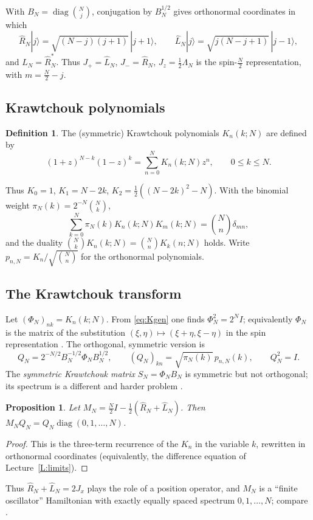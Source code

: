 \documentclass[11pt,reqno]{amsart}
\newtheorem{proposition}[theorem]{Proposition}
\theoremstyle{definition}
\newtheorem{definition}[theorem]{Definition}
\theoremstyle{remark}
\newcommand{\Id}{I}
\DeclareMathOperator{\diag}{diag}
\begin{document}
With $B_N=\diag\binom Nj$, conjugation by $B_N^{1/2}$ gives orthonormal
coordinates in which
\[
\widehat R_N|j\rangle=\sqrt{(N-j)(j+1)}\,|j+1\rangle,\qquad
\widehat L_N|j\rangle=\sqrt{j(N-j+1)}\,|j-1\rangle,
\]
and $\widehat L_N=\widehat R_N^*$. Thus $J_+=\widehat L_N$,
$J_-=\widehat R_N$, $J_z=\frac12\Lambda_N$ is the spin-$\frac N2$
representation, with $m=\frac N2-j$.

\subsection{Krawtchouk polynomials}
\begin{definition}
The (symmetric) Krawtchouk polynomials $K_n(k;N)$ are defined by
\begin{equation}\label{eq:Kgen}
(1+z)^{N-k}(1-z)^k=\sum_{n=0}^NK_n(k;N)z^n,\qquad 0\le k\le N.
\end{equation}
\end{definition}
Thus $K_0=1$, $K_1=N-2k$, $K_2=\frac12((N-2k)^2-N)$. With the binomial
weight $\pi_N(k)=2^{-N}\binom Nk$,
\begin{equation}\label{eq:Korth}
\sum_{k=0}^N\pi_N(k)K_n(k;N)K_m(k;N)=\binom Nn\delta_{mn},
\end{equation}
and the duality $\binom NkK_n(k;N)=\binom NnK_k(n;N)$ holds.
Write $p_{n,N}=K_n/\sqrt{\binom Nn}$ for the orthonormal polynomials.

\subsection{The Krawtchouk transform}
Let $(\Phi_N)_{nk}=K_n(k;N)$. From \eqref{eq:Kgen} one finds
$\Phi_N^2=2^N\Id$; equivalently $\Phi_N$ is the matrix of the
substitution $(\xi,\eta)\mapsto(\xi+\eta,\xi-\eta)$ in the spin
representation \cite{FeinsilverKocik2005}. The orthogonal, symmetric
version is
\begin{equation}\label{eq:Q}
Q_N=2^{-N/2}B_N^{-1/2}\Phi_NB_N^{1/2},\qquad
(Q_N)_{kn}=\sqrt{\pi_N(k)}\,p_{n,N}(k),\qquad Q_N^2=\Id.
\end{equation}
The \emph{symmetric Krawtchouk matrix} $S_N=\Phi_NB_N$ is symmetric but
not orthogonal; its spectrum is a different and harder problem
\cite{FeinsilverFitzgerald1996}.

\begin{proposition}\label{prop:Qdiag}
Let $M_N=\frac N2\Id-\frac12(\widehat R_N+\widehat L_N)$. Then
$M_NQ_N=Q_N\diag(0,1,\dots,N)$.
\end{proposition}
\begin{proof}
This is the three-term recurrence of the $K_n$ in the variable $k$,
rewritten in orthonormal coordinates (equivalently, the difference
equation of Lecture~\ref{L:limits}).
\end{proof}
Thus $\widehat R_N+\widehat L_N=2J_x$ plays the role of a position
operator, and $M_N$ is a ``finite oscillator'' Hamiltonian with exactly
equally spaced spectrum $0,1,\dots,N$; compare
\cite{AtakishievSuslov1990,AtakishievWolf1997}.
\end{document}
